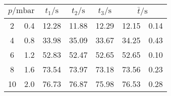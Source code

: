 \label{tab:tabDL2}
	\begin{tabular}{S[table-format=2.0] @{${}\pm{}$} S[table-format=1.1]S[table-format=2.2]S[table-format=2.2]S[table-format=2.2]S[table-format=2.2] @{${}\pm{}$} S[table-format=1.2]}
		\toprule
		 & {$t_1/\si{\second}$} & {$t_2/\si{\second}$} & {$t_3/\si{\second}$} &  \\
		 & 0.4 & 12.28 & 11.88 & 12.29 & 12.15 & 0.14 \\
		 4 & 0.8 & 33.98 & 35.09 & 33.67 & 34.25 & 0.43 \\
		 6 & 1.2 & 52.83 & 52.47 & 52.65 & 52.65 & 0.10 \\
		 8 & 1.6 & 73.54 & 73.97 & 73.18 & 73.56 & 0.23 \\
		10 & 2.0 & 76.73 & 76.87 & 75.98 & 76.53 & 0.28 \\
		\bottomrule
	\end{tabular}
